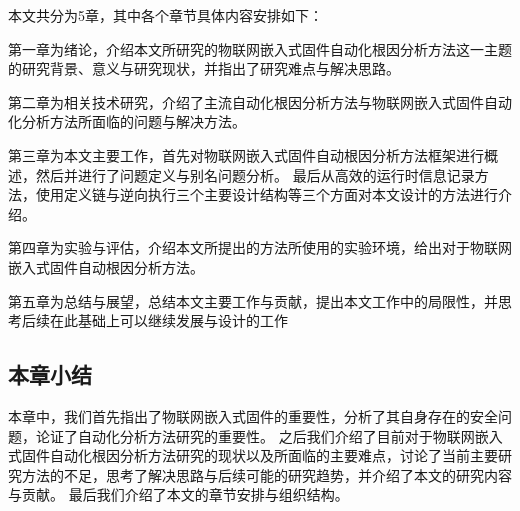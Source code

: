 本文共分为5章，其中各个章节具体内容安排如下：

第一章为绪论，介绍本文所研究的物联网嵌入式固件自动化根因分析方法这一主题的研究背景、意义与研究现状，并指出了研究难点与解决思路。

第二章为相关技术研究，介绍了主流自动化根因分析方法与物联网嵌入式固件自动化分析方法所面临的问题与解决方法。

第三章为本文主要工作，首先对物联网嵌入式固件自动根因分析方法框架进行概述，然后并进行了问题定义与别名问题分析。
最后从高效的运行时信息记录方法，使用定义链与逆向执行三个主要设计结构等三个方面对本文设计的方法进行介绍。

第四章为实验与评估，介绍本文所提出的方法所使用的实验环境，给出对于物联网嵌入式固件自动根因分析方法。

第五章为总结与展望，总结本文主要工作与贡献，提出本文工作中的局限性，并思考后续在此基础上可以继续发展与设计的工作

\subsection{本章小结}
本章中，我们首先指出了物联网嵌入式固件的重要性，分析了其自身存在的安全问题，论证了自动化分析方法研究的重要性。
之后我们介绍了目前对于物联网嵌入式固件自动化根因分析方法研究的现状以及所面临的主要难点，讨论了当前主要研究方法的不足，思考了解决思路与后续可能的研究趋势，并介绍了本文的研究内容与贡献。
最后我们介绍了本文的章节安排与组织结构。